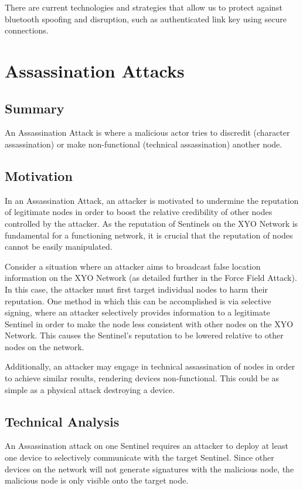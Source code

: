 \documentclass{article}
\begin{document}
There are current technologies and strategies that allow us to protect against bluetooth spoofing and disruption, such as authenticated link key using secure connections. \cite{bluetooth2}

\section{Assassination Attacks}

\subsection{Summary}

An Assassination Attack is where a malicious actor tries to discredit (character assassination) or make non-functional (technical assassination) another node.

\subsection{Motivation}

In an Assassination Attack, an attacker is motivated to undermine the reputation of legitimate nodes in order to boost the relative credibility of other nodes controlled by the attacker. As the reputation of Sentinels on the XYO Network is fundamental for a functioning network, it is crucial that the reputation of nodes cannot be easily manipulated.

Consider a situation where an attacker aims to broadcast false location information on the XYO Network (as detailed further in the Force Field Attack). In this case, the attacker must first target individual nodes to harm their reputation. One method in which this can be accomplished is via selective signing, where an attacker selectively provides information to a legitimate Sentinel in order to make the node less consistent with other nodes on the XYO Network. This causes the Sentinel's reputation to be lowered relative to other nodes on the network.

Additionally, an attacker may engage in technical assassination of nodes in order to achieve similar results, rendering devices non-functional. This could be as simple as a physical attack destroying a device.

\subsection{Technical Analysis}

An Assassination attack on one Sentinel requires an attacker to deploy at least one device to selectively communicate with the target Sentinel. Since other devices on the network will not generate signatures with the malicious node, the malicious node is only visible onto the target node.
\end{document}
